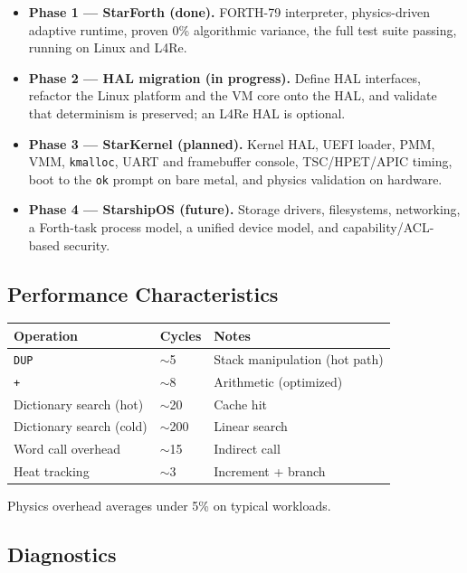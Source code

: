 \begin{itemize}
  \item \textbf{Phase 1 --- StarForth (done).} FORTH-79 interpreter,
    physics-driven adaptive runtime, proven 0\% algorithmic variance, the full
    test suite passing, running on Linux and L4Re.
  \item \textbf{Phase 2 --- HAL migration (in progress).} Define HAL interfaces,
    refactor the Linux platform and the VM core onto the HAL, and validate that
    determinism is preserved; an L4Re HAL is optional.
  \item \textbf{Phase 3 --- StarKernel (planned).} Kernel HAL, UEFI loader, PMM,
    VMM, \texttt{kmalloc}, UART and framebuffer console, TSC/HPET/APIC timing,
    boot to the \texttt{ok} prompt on bare metal, and physics validation on
    hardware.
  \item \textbf{Phase 4 --- StarshipOS (future).} Storage drivers, filesystems,
    networking, a Forth-task process model, a unified device model, and
    capability/ACL-based security.
\end{itemize}


\subsection{Performance Characteristics}

\begin{tabular}{lll}
\toprule
Operation & Cycles & Notes \\
\midrule
\texttt{DUP} & $\sim$5 & Stack manipulation (hot path) \\
\texttt{+} & $\sim$8 & Arithmetic (optimized) \\
Dictionary search (hot) & $\sim$20 & Cache hit \\
Dictionary search (cold) & $\sim$200 & Linear search \\
Word call overhead & $\sim$15 & Indirect call \\
Heat tracking & $\sim$3 & Increment + branch \\
\bottomrule
\end{tabular}

Physics overhead averages under 5\% on typical workloads.

\subsection{Diagnostics}

